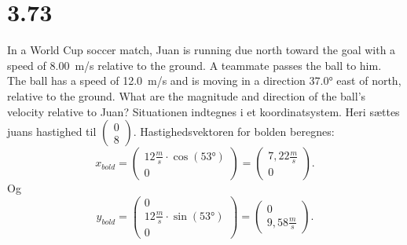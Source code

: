 \documentclass[12pt]{article}
\begin{document}
\section*{3.73}
	In a World Cup soccer match, Juan is running due north toward the goal with a speed of \qty{8.00}{m/s} relative to the ground. A teammate passes the ball to him. The ball has a speed of \qty{12.0}{m/s} and is moving in a direction \ang{37.0} east of north, relative to the ground. What are the magnitude and direction of the ball's velocity relative to Juan?
	\bigbreak
	Situationen indtegnes i et koordinatsystem. Heri sættes juans hastighed til $\begin{pmatrix} 0 \\ 8 \end{pmatrix}$. Hastighedsvektoren for bolden beregnes:
	\[
		x_{bold} = \begin{pmatrix} 12 \frac{m}{s} \cdot \cos\left( \ang{53} \right)  \\ 0 \end{pmatrix} = \begin{pmatrix} 7,22 \frac{m}{s} \\ 0 \end{pmatrix}  
	.\] 
	Og
	\[ 
		y_{bold} = \begin{pmatrix} 0 \\ 12 \frac{m}{s} \cdot \sin\left( \ang{53} \right)  \\ 0 \end{pmatrix} = \begin{pmatrix} 0 \\ 9,58 \frac{m}{s} \end{pmatrix}  
	.\]
\end{document}
